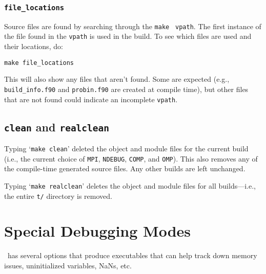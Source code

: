 \subsubsection{{\tt file\_locations}}

Source files are found by searching through the {\tt make} {\tt
  vpath}.  The first instance of the file found in the {\tt vpath}
is used in the build.  To see which files are used and their locations,
do:
\begin{verbatim}
make file_locations
\end{verbatim}

This will also show any files that aren't found.  Some are expected
(e.g., {\tt build\_info.f90} and {\tt probin.f90} are created at
compile time), but other files that are not found could indicate
an incomplete {\tt vpath}.

\subsection{{\tt clean} and {\tt realclean}}

Typing `{\tt make clean}' deleted the object and module files for the
current build (i.e., the current choice of {\tt MPI}, {\tt NDEBUG},
{\tt COMP}, and {\tt OMP}).  This also removes any of the compile-time
generated source files.  Any other builds are left unchanged.

Typing `{\tt make realclean}' deletes the object and module files for
all builds---i.e., the entire {\tt t/} directory is removed.


\section{Special Debugging Modes}

\label{ch:makefiles:special}

\fboxlib\ has several options that produce executables that can help
track down memory issues, uninitialized variables, NaNs, etc.

